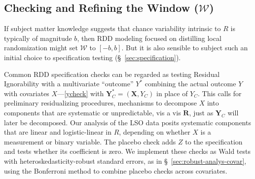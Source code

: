 \subsection{Checking and Refining the Window ($\mathcal{W}$)}
\label{sec:bandwidthChoice}

If subject matter knowledge suggests that chance variability intrinsic
to $R$ is typically of magnitude $b$, then RDD modeling focused on
distilling local randomization might set $\mathcal{W}$ to $[-b,b]$. But it
is also sensible to subject such an initial choice to specification
testing (\S~\ref{sec:specification}).%

Common RDD specification checks
can be regarded as testing Residual Ignorability with a multivariate
``outcome'' $Y^{*}$ combining the actual outcome $Y$ with covariates $X$---\eqref{ycheck} with
$\mathbf{Y}_{C}^{*} = (\mathbf{X}, {Y}_C)$ in place of $Y_{C}$.
%
This calls for preliminary residualizing procedures, mechanisms to
decompose  $X$ into components that are systematic or unpredictable,
vis a vis $\mathbf{R}$, just as ${\mathbf{Y}_C}$ will later be decomposed.
Our analysis of the LSO data posits systematic components that are
linear and logistic-linear in $R$, depending on whether $X$ is
a measurement or binary variable. %
The placebo check adds $Z$ to the specification and tests whether its
coefficient is zero.  We implement these checks as Wald tests with
heteroskedasticity-robust standard errors, as in
\S~\ref{sec:robust-analys-covar}, using the Bonferroni method to
combine placebo checks across covariates.


